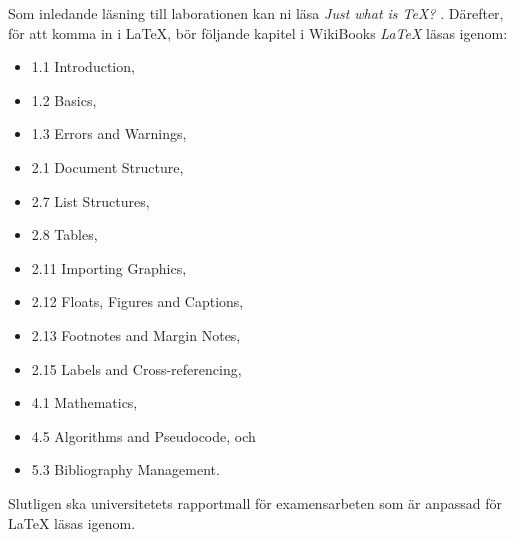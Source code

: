 Som inledande läsning till laborationen kan ni läsa \emph{Just what is \TeX?} 
\citep{TUG2011jwi}.
Därefter, för att komma in i \LaTeX, bör följande kapitel i WikiBooks 
\emph{\LaTeX} \citep{Wikibooks2012l} läsas igenom:
\begin{itemize}
	\item 1.1 Introduction,
	\item 1.2 Basics,
	\item 1.3 Errors and Warnings,
	\item 2.1 Document Structure,
	\item 2.7 List Structures,
	\item 2.8 Tables,
	\item 2.11 Importing Graphics,
	\item 2.12 Floats, Figures and Captions,
	\item 2.13 Footnotes and Margin Notes,
	\item 2.15 Labels and Cross-referencing,
	\item 4.1 Mathematics,
	\item 4.5 Algorithms and Pseudocode, och
	\item 5.3 Bibliography Management.
\end{itemize}

Slutligen ska universitetets rapportmall för examensarbeten som är anpassad för 
\LaTeX{} \citep{Bosk2012etr} läsas igenom.
